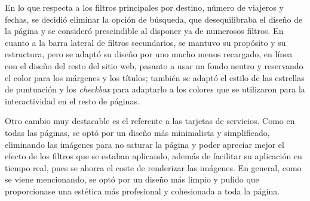 \documentclass[11pt, a4paper]{book}
\begin{document}
    En lo que respecta a los filtros principales por destino, número de viajeros y fechas, se decidió eliminar la opción de búsqueda, que desequilibraba el diseño de la página y se consideró prescindible al disponer ya de numerosos filtros. En cuanto a la barra lateral de filtros secundarios, se mantuvo su propósito y su estructura, pero se adaptó su diseño por uno mucho menos recargado, en línea con el diseño del resto del sitio web, pasanto a usar un fondo neutro y reservando el color para los márgenes y los títulos; también se adaptó el estilo de las estrellas de puntuación y los \textit{checkbox} para adaptarlo a los colores que se utilizaron para la interactividad en el resto de páginas. 

    Otro cambio muy destacable es el referente a las tarjetas de servicios. Como en todas las páginas, se optó por un diseño más minimalista y simplificado, eliminando las imágenes para no saturar la página y poder apreciar mejor el efecto de los filtros que se estaban aplicando, además de facilitar su aplicación en tiempo real, pues se ahorra el coste de renderizar las imágenes. En general, como se viene mencionando, se optó por un diseño más limpio y pulido que proporcionase una estética más profesional y cohesionada a toda la página.
\end{document}
